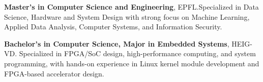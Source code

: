 \vspace*{-5mm}

\begin{scholarship}
    {\textbf{Master's in Computer Science and Engineering}, EPFL.\newline Specialized in Data Science, Hardware and System Design with strong focus on Machine Learning, Applied Data Analysis, Computer Systems, and Information Security.}

    {\textbf{Bachelor's in Computer Science, Major in Embedded Systems}, HEIG-VD.\newline 
    Specialized in FPGA/SoC design, high-performance computing, and system programming, with hands-on experience in Linux kernel module development and FPGA-based accelerator design.}
	
\end{scholarship}